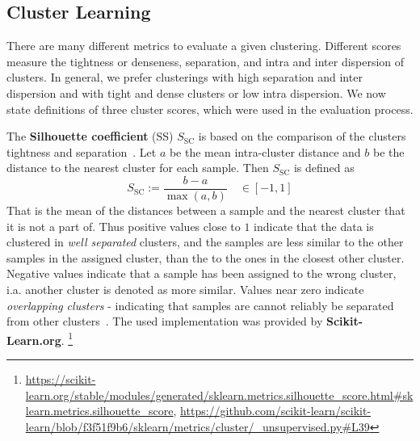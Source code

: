 \subsection{Cluster Learning} \label{subsec:def_cl_scores}

	There are many different metrics to evaluate a given clustering.
	Different scores measure the tightness or denseness, separation, and intra and inter dispersion of clusters.
	In general, we prefer clusterings with high separation and inter dispersion and with tight and dense clusters or low intra dispersion.
	We now state definitions of three cluster scores, which were used in the evaluation process.
	
	The \textbf{Silhouette coefficient} (SS) $S_{\text{SC}}$ is based on the comparison of the clusters tightness and separation~\cite{1987_Rousseeuw_ELSEVIER}.
	Let $a$ be the mean intra-cluster distance and $b$ be the distance to the nearest cluster for each sample.
	Then $S_{\text{SC}}$ is defined as
	\[ S_{\text{SC}} := \frac{ b - a }{ \max(a, b) } \quad \in[-1, 1]\]
	That is the mean of the distances between a sample and the nearest cluster that it is not a part of.
	Thus positive values close to $1$ indicate that the data is clustered in \textit{well separated} clusters, and the samples are less similar to the other samples in the assigned cluster, than the to the ones in the closest other cluster.
	Negative values indicate that a sample has been assigned to the wrong cluster, i.a. another cluster is denoted as more similar.
	Values near zero indicate \textit{overlapping clusters} - indicating that samples are cannot reliably be separated from other clusters~\cite{1987_Rousseeuw_ELSEVIER}.
	The used implementation was provided by \textbf{Scikit-Learn.org}.
	\footnote{ \url{https://scikit-learn.org/stable/modules/generated/sklearn.metrics.silhouette_score.html\#sklearn.metrics.silhouette_score},		\url{https://github.com/scikit-learn/scikit-learn/blob/f3f51f9b6/sklearn/metrics/cluster/_unsupervised.py\#L39} }
	
